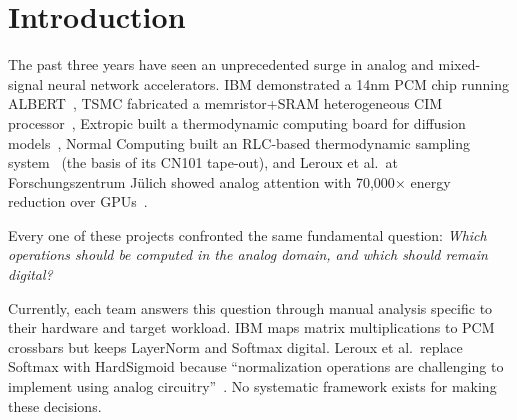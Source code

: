 \documentclass[11pt]{article}
\begin{document}
\begin{abstract}
non-idealities leave closure below $10^{-3}$ at a realistic 60~dB integrator gain; and thermal/shot noise is a third per-channel exposure obeying $\sigma_{\mathrm{pc}} = 0.78\sqrt{k_j\,2qB/I_0}$, equal to the mismatch residual at $I_0=1\,\mu$A and $B=122$~MHz, which is---to 2\%---the noise bandwidth the loop has when it is critically damped.

\smallskip\noindent\textit{Version 3.1 corrects:} (i)~the overshoot of the published AGC loop, which is $+40.4\%$ of the step on a small-signal step (the $+15.6\%$ of v3 is the second extremum) and $89\%$ of the step on the large-signal $2.5\times$ step (the $+47\%$ of v3 is the rebound); (ii)~the description of the primes as ``irreducible'': they are elementary hardware primitives, and some can be composed from others; (iii)~the multi-computation multipliers, which are aligned with the current version of the companion paper (operation counts per event, not throughput or precision gains; the AGC pattern adds one informative static channel, not $4\times$); the code archive is updated accordingly.
\end{abstract}

\section{Introduction}

The past three years have seen an unprecedented surge in analog and mixed-signal neural network accelerators. IBM demonstrated a 14nm PCM chip running ALBERT~\cite{ibm2025}, TSMC fabricated a memristor+SRAM heterogeneous CIM processor~\cite{tsmc2025}, Extropic built a thermodynamic computing board for diffusion models~\cite{extropic2025}, Normal Computing built an RLC-based thermodynamic sampling system~\cite{normal2025} (the basis of its CN101 tape-out), and Leroux et al.\ at Forschungszentrum J\"ulich showed analog attention with 70,000$\times$ energy reduction over GPUs~\cite{leroux2025a}.

Every one of these projects confronted the same fundamental question: \textit{Which operations should be computed in the analog domain, and which should remain digital?}

Currently, each team answers this question through manual analysis specific to their hardware and target workload. IBM maps matrix multiplications to PCM crossbars but keeps LayerNorm and Softmax digital. Leroux et al.\ replace Softmax with HardSigmoid because ``normalization operations are challenging to implement using analog circuitry''~\cite{leroux2025a}. No systematic framework exists for making these decisions.
\end{document}
